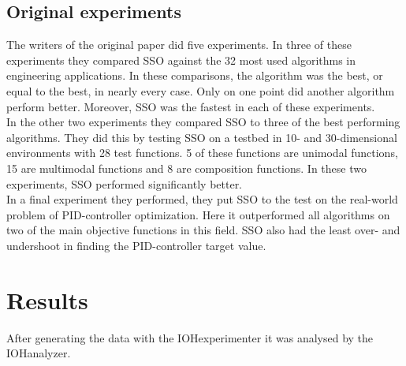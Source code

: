 \documentclass[runningheads]{llncs}
\begin{document}


\subsection{Original experiments}
The writers of the original paper did five experiments. In three of these experiments they compared SSO against the 32 most used algorithms in engineering applications. In these comparisons, the algorithm was the best, or equal to the best, in nearly every case. Only on one point did another algorithm perform better. Moreover, SSO was the fastest in each of these experiments. \\
In the other two experiments they compared SSO to three of the best performing algorithms. They did this by testing SSO on a testbed in 10- and 30-dimensional environments with 28 test functions. 5 of these functions are unimodal functions, 15 are multimodal functions and 8 are composition functions. In these two experiments, SSO performed significantly better.\\
In a final experiment they performed, they put SSO to the test on the real-world problem of PID-controller optimization. Here it outperformed all algorithms on two of the main objective functions in this field. SSO also had the least over- and undershoot in finding the PID-controller target value.




\section{Results}
After generating the data with the IOHexperimenter it was analysed by the IOHanalyzer.
\end{document}
